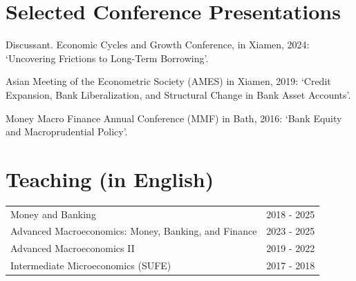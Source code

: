 \documentclass[11pt]{article}
\begin{document}
\section*{Selected Conference Presentations}
\begin{enumerate}[label={[\arabic*]}]
\item { Discussant. Economic Cycles and Growth Conference, in Xiamen, 2024: `Uncovering Frictions to Long-Term Borrowing'.}
\item { Asian Meeting of the Econometric Society (AMES) in Xiamen, 2019: `Credit Expansion, Bank Liberalization, and Structural Change in Bank Asset Accounts'.}
\item { Money Macro Finance Annual Conference (MMF) in Bath, 2016: `Bank Equity and Macroprudential Policy'.}
\end{enumerate}


\section*{Teaching (in English)}
\begin{tabular}{L{11cm} L{4cm}}
Money and Banking & 2018 - 2025 \\
Advanced Macroeconomics: Money, Banking, and Finance & 2023 - 2025 \\
Advanced Macroeconomics II & 2019 - 2022 \\
Intermediate Microeconomics (SUFE) & 2017 - 2018 \\
\end{tabular}
\end{document}
